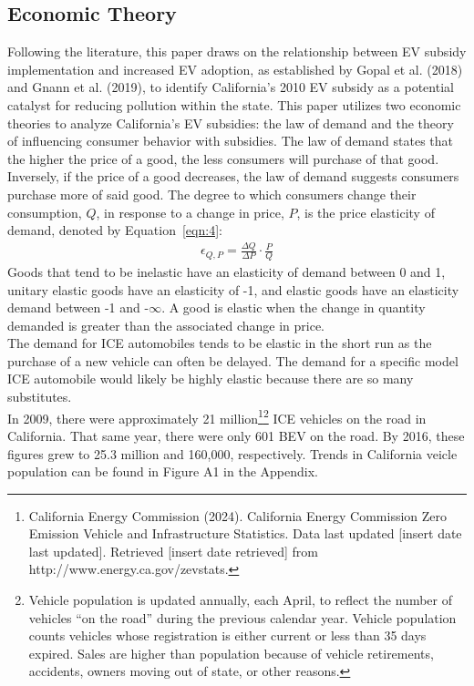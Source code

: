 \documentclass[12pt]{article}
\newcommand\tab[1][.50cm]{\hspace*{#1}}
\begin{document}
\begin{multicols}{2}
		\section*{Economic Theory}
		Following the literature, this paper draws on the relationship between EV subsidy implementation and increased EV adoption, as established by Gopal et al. (2018) and Gnann et al. (2019), to identify California's 2010 EV subsidy as a potential catalyst for reducing pollution within the state. This paper utilizes two economic theories to analyze California's EV subsidies: the law of demand and the theory of influencing consumer behavior with subsidies. The law of demand states that the higher the price of a good, the less consumers will purchase of that good. Inversely, if the price of a good decreases, the law of demand suggests consumers purchase more of said good. The degree to which consumers change their consumption, $Q$, in response to a change in price, $P$, is the price elasticity of demand, denoted by Equation~\ref{eqn:4}:
		\begin{align}
			\ \epsilon_{Q,P} = \frac{\Delta Q}{\Delta P} \cdot \frac{P}{Q} \ 
			\label{eqn:4}
		\end{align}
		Goods that tend to be inelastic have an elasticity of demand between 0 and 1, unitary elastic goods have an elasticity of -1, and elastic goods have an elasticity demand between -1 and -$\infty$. A good is elastic when the change in quantity demanded is greater than the associated change in price. \\
		\tab The demand for ICE automobiles tends to be elastic in the short run as the purchase of a new vehicle can often be delayed. The demand for a specific model ICE automobile would likely be highly elastic because there are so many substitutes. \\
		\tab In 2009, there were approximately 21 million\footnote{California Energy Commission (2024). California Energy Commission Zero Emission Vehicle and Infrastructure Statistics. Data last updated [insert date last updated]. Retrieved [insert date retrieved] from http://www.energy.ca.gov/zevstats.
		}\footnote{Vehicle population is updated annually, each April, to reflect the number of vehicles “on the road” during the previous calendar year. Vehicle population counts vehicles whose registration is either current or less than 35 days expired. Sales are higher than population because of vehicle retirements, accidents, owners moving out of state, or other reasons.} ICE vehicles on the road in California.  That same year, there were only 601 BEV on the road. By 2016, these figures grew to 25.3 million and 160,000, respectively. Trends in California veicle population can be found in Figure A1 in the Appendix. \\

\end{multicols}
\end{document}
